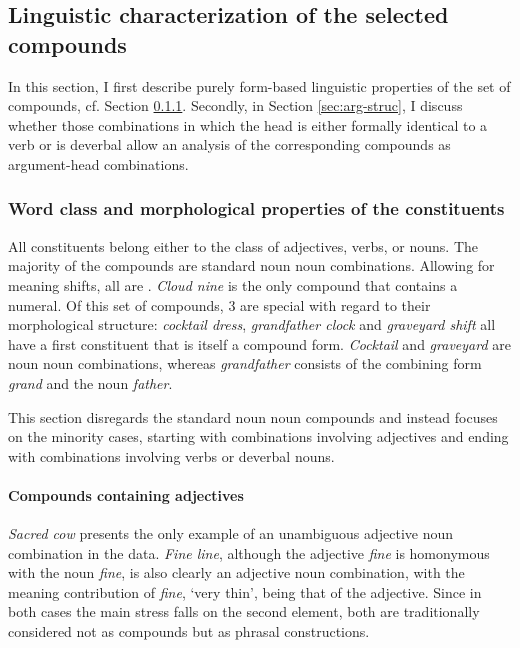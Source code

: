 \subsection{Linguistic characterization of the selected compounds}
\label{sec:linguistic-characeterization}
In this section, I first describe purely form-based linguistic properties of the
set of compounds, cf. Section
\ref{sec:con-wordclass}. Secondly, in Section \ref{sec:arg-struc}, I discuss whether those combinations in
which the head is either formally identical to a verb or is deverbal allow an analysis of
the corresponding compounds as argument-head combinations. 

\subsubsection{Word class and morphological properties of the constituents}
\label{sec:con-wordclass}

All constituents belong either to the class of adjectives,
verbs, or nouns. The majority of the compounds are standard noun noun
combinations. Allowing for meaning shifts,
all are . \emph{Cloud nine} is the only compound that contains a numeral. Of this set of compounds, 3 are special with
regard to their morphological structure: \emph{cocktail dress}, \emph{grandfather clock} and
\emph{graveyard shift} all have a first constituent that is itself a
compound form. \emph{Cocktail} and \emph{graveyard} are noun noun
combinations, whereas \emph{grandfather} consists of the combining
form \emph{grand} and the noun \emph{father}.

This section disregards the standard noun noun compounds and instead focuses on the minority cases, starting
with combinations involving adjectives and ending with combinations
involving verbs or deverbal nouns.

\paragraph{Compounds containing adjectives}

\emph{Sacred cow} presents the only example of an unambiguous
adjective noun combination in the data. \emph{Fine line}, although the
adjective \emph{fine} is homonymous with the noun \emph{fine}, is also
clearly an adjective noun combination, with the meaning contribution
of \emph{fine}, `very thin', being that of the adjective. Since in
both cases the main stress falls on the second element, both are
traditionally considered not as compounds but as phrasal constructions.


